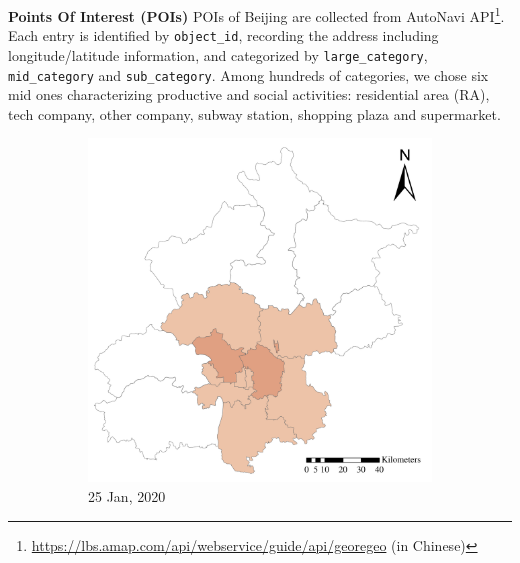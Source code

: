 \documentclass[ijgi,submit,moreauthors,pdftex]{Definitions/mdpi}
\begin{document}
\textbf{Points Of Interest (POIs)} POIs of Beijing are collected from AutoNavi API\footnote{\url{https://lbs.amap.com/api/webservice/guide/api/georegeo} (in Chinese)}.
Each entry is identified by \texttt{object\_id}, recording the address including longitude/latitude information, and categorized by \texttt{large\_category}, \texttt{mid\_category} and \texttt{sub\_category}.
Among hundreds of categories, we chose six mid ones characterizing productive and social activities: residential area (RA), tech company, other company, subway station, shopping plaza and supermarket.

\begin{figure}[ht]
    \centering
    \begin{subfigure}{.23\textwidth}
        \includegraphics[width=\textwidth]{Figures/ConfirmedDistrictD2020_01_25-eps-converted-to.pdf}
        \caption{25 Jan, 2020}
    \end{subfigure}
    \begin{subfigure}{.23\textwidth}

\end{subfigure}
\end{figure}
\end{document}
